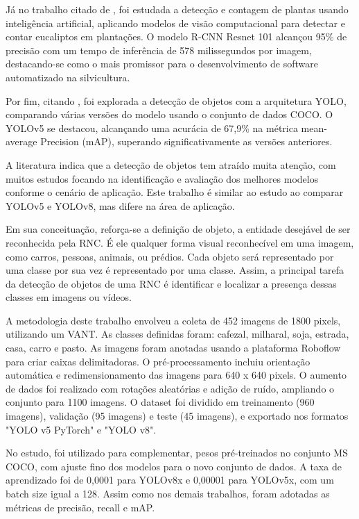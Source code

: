 Já no trabalho citado de \cite{silva2018detecccao}, foi estudada a detecção e contagem de plantas usando inteligência artificial, aplicando modelos de visão computacional para detectar e contar eucaliptos em plantações. O modelo R-CNN Resnet 101 alcançou 95\% de precisão com um tempo de inferência de 578 milissegundos por imagem, destacando-se como o mais promissor para o desenvolvimento de software automatizado na silvicultura.

Por fim, citando \cite{gomes2022detecccao}, foi explorada a detecção de objetos com a arquitetura YOLO, comparando várias versões do modelo usando o conjunto de dados COCO. O YOLOv5 se destacou, alcançando uma acurácia de 67,9\% na métrica mean-average Precision (mAP), superando significativamente as versões anteriores.

A literatura indica que a detecção de objetos tem atraído muita atenção, com muitos estudos focando na identificação e avaliação dos melhores modelos conforme o cenário de aplicação. Este trabalho é similar ao estudo \cite{afonso2023vehicle} ao comparar YOLOv5 e YOLOv8, mas difere na área de aplicação.

Em sua conceituação, reforça-se a definição de objeto, a entidade desejável de ser reconhecida pela RNC. É ele qualquer forma visual reconhecível em uma imagem, como carros, pessoas, animais, ou prédios. Cada objeto será representado por uma classe por sua vez é representado por uma classe. Assim, a principal tarefa da detecção de objetos de uma RNC é identificar e localizar a presença dessas classes em imagens ou vídeos.

A metodologia deste trabalho envolveu a coleta de 452 imagens de 1800 pixels, utilizando um VANT. As classes definidas foram: cafezal, milharal, soja, estrada, casa, carro e pasto. As imagens foram anotadas usando a plataforma Roboflow para criar caixas delimitadoras. O pré-processamento incluiu orientação automática e redimensionamento das imagens para 640 x 640 pixels. O aumento de dados foi realizado com rotações aleatórias e adição de ruído, ampliando o conjunto para 1100 imagens. O dataset foi dividido em treinamento (960 imagens), validação (95 imagens) e teste (45 imagens), e exportado nos formatos "YOLO v5 PyTorch" e "YOLO v8".

No estudo, foi utilizado para complementar, pesos pré-treinados no conjunto MS COCO, com ajuste fino dos modelos para o novo conjunto de dados. A taxa de aprendizado foi de 0,0001 para YOLOv8x e 0,00001 para YOLOv5x, com um batch size igual a 128. Assim como nos demais trabalhos, foram adotadas as métricas de precisão, recall e mAP.

